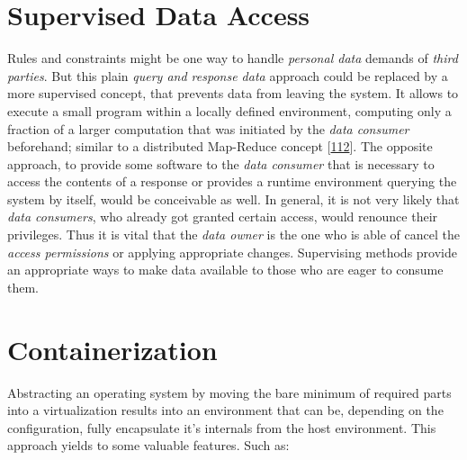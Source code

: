 \documentclass[12pt,english,a4paper,titlepage,cleardoublepage=empty,dottedtoc]{report}
\begin{document}
\hypertarget{supervised-data-access}{\section{Supervised Data
Access}\label{supervised-data-access}}

Rules and constraints might be one way to handle \emph{personal data}
demands of \emph{third parties}. But this plain \emph{query and response
data} approach could be replaced by a more supervised concept, that
prevents data from leaving the system. It allows to execute a small
program within a locally defined environment, computing only a fraction
of a larger computation that was initiated by the \emph{data consumer}
beforehand; similar to a distributed Map-Reduce concept
{[}\protect\hyperlink{ref-paper_2004_distributed-mapreduce}{112}{]}. The
opposite approach, to provide some software to the \emph{data consumer}
that is necessary to access the contents of a response or provides a
runtime environment querying the system by itself, would be conceivable
as well. In general, it is not very likely that \emph{data consumers},
who already got granted certain access, would renounce their privileges.
Thus it is vital that the \emph{data owner} is the one who is able of
cancel the \emph{access permissions} or applying appropriate changes.
Supervising methods provide an appropriate ways to make data available
to those who are eager to consume them.

\section{Containerization}\label{containerization}

Abstracting an operating system by moving the bare minimum of required
parts into a virtualization results into an environment that can be,
depending on the configuration, fully encapsulate it's internals from
the host environment. This approach yields to some valuable features.
Such as:
\end{document}
